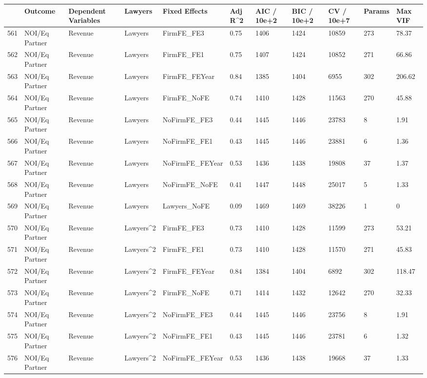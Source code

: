 \documentclass{article}
\begin{document}
\begin{table}[H]
\centering
\begin{tabular}{rllllllllll}
  \hline
 & Outcome & Dependent Variables & Lawyers & Fixed Effects & Adj R^2 & AIC / 10e+2 & BIC / 10e+2 & CV / 10e+7 & Params & Max VIF \\ 
  \hline
561 & NOI/Eq Partner & Revenue & Lawyers & FirmFE\_FE3 & 0.75 & 1406 & 1424 & 10859 & 273 & 78.37 \\ 
  562 & NOI/Eq Partner & Revenue & Lawyers & FirmFE\_FE1 & 0.75 & 1407 & 1424 & 10852 & 271 & 66.86 \\ 
  563 & NOI/Eq Partner & Revenue & Lawyers & FirmFE\_FEYear & 0.84 & 1385 & 1404 & 6955 & 302 & 206.62 \\ 
  564 & NOI/Eq Partner & Revenue & Lawyers & FirmFE\_NoFE & 0.74 & 1410 & 1428 & 11563 & 270 & 45.88 \\ 
  565 & NOI/Eq Partner & Revenue & Lawyers & NoFirmFE\_FE3 & 0.44 & 1445 & 1446 & 23783 & 8 & 1.91 \\ 
  566 & NOI/Eq Partner & Revenue & Lawyers & NoFirmFE\_FE1 & 0.43 & 1445 & 1446 & 23881 & 6 & 1.36 \\ 
  567 & NOI/Eq Partner & Revenue & Lawyers & NoFirmFE\_FEYear & 0.53 & 1436 & 1438 & 19808 & 37 & 1.37 \\ 
  568 & NOI/Eq Partner & Revenue & Lawyers & NoFirmFE\_NoFE & 0.41 & 1447 & 1448 & 25017 & 5 & 1.33 \\ 
  569 & NOI/Eq Partner & Revenue & Lawyers & Lawyers\_NoFE & 0.09 & 1469 & 1469 & 38226 & 1 & 0 \\ 
  570 & NOI/Eq Partner & Revenue & Lawyers^2 & FirmFE\_FE3 & 0.73 & 1410 & 1428 & 11599 & 273 & 53.21 \\ 
  571 & NOI/Eq Partner & Revenue & Lawyers^2 & FirmFE\_FE1 & 0.73 & 1410 & 1428 & 11570 & 271 & 45.83 \\ 
  572 & NOI/Eq Partner & Revenue & Lawyers^2 & FirmFE\_FEYear & 0.84 & 1384 & 1404 & 6892 & 302 & 118.47 \\ 
  573 & NOI/Eq Partner & Revenue & Lawyers^2 & FirmFE\_NoFE & 0.71 & 1414 & 1432 & 12642 & 270 & 32.33 \\ 
  574 & NOI/Eq Partner & Revenue & Lawyers^2 & NoFirmFE\_FE3 & 0.44 & 1445 & 1446 & 23756 & 8 & 1.91 \\ 
  575 & NOI/Eq Partner & Revenue & Lawyers^2 & NoFirmFE\_FE1 & 0.43 & 1445 & 1446 & 23781 & 6 & 1.32 \\ 
  576 & NOI/Eq Partner & Revenue & Lawyers^2 & NoFirmFE\_FEYear & 0.53 & 1436 & 1438 & 19668 & 37 & 1.33 \\ 

\end{tabular}
\end{table}
\end{document}

